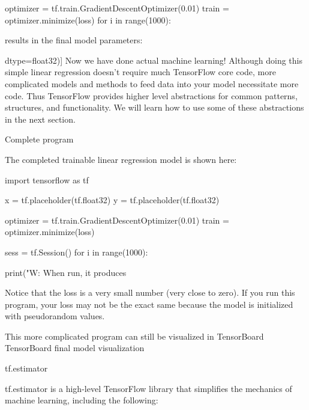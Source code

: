\documentclass[10pt,a4paper]{ctexbook}
\begin{document}
optimizer = tf.train.GradientDescentOptimizer(0.01)
train = optimizer.minimize(loss)
for i in range(1000):

results in the final model parameters:

 dtype=float32)]
Now we have done actual machine learning! Although doing this simple linear regression doesn't require much TensorFlow core code, more complicated models and methods to feed data into your model necessitate more code. Thus TensorFlow provides higher level abstractions for common patterns, structures, and functionality. We will learn how to use some of these abstractions in the next section.

Complete program

The completed trainable linear regression model is shown here:

import tensorflow as tf

x = tf.placeholder(tf.float32)
y = tf.placeholder(tf.float32)

optimizer = tf.train.GradientDescentOptimizer(0.01)
train = optimizer.minimize(loss)

sess = tf.Session()
for i in range(1000):

print("W: %
When run, it produces

Notice that the loss is a very small number (very close to zero). If you run this program, your loss may not be the exact same because the model is initialized with pseudorandom values.

This more complicated program can still be visualized in TensorBoard TensorBoard final model visualization

tf.estimator

tf.estimator is a high-level TensorFlow library that simplifies the mechanics of machine learning, including the following:
\end{document}
